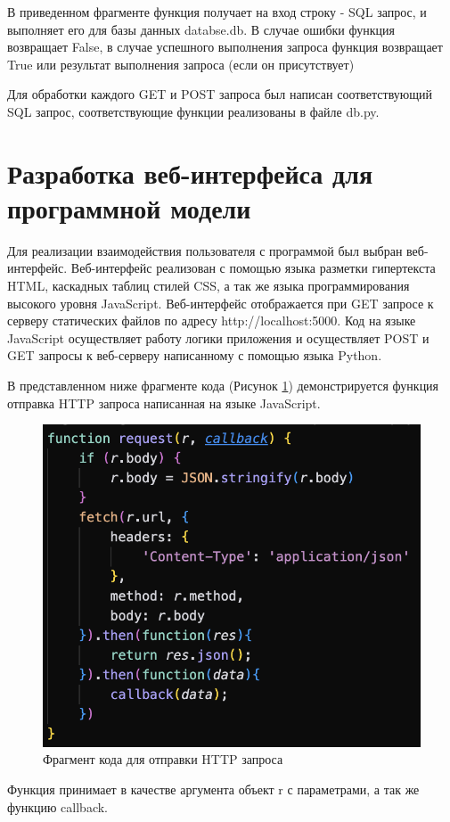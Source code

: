 \documentclass[14pt]{extreport}
\begin{document}
В приведенном фрагменте функция получает на вход строку - SQL запрос, и выполняет его для базы данных databse.db. В случае ошибки функция возвращает False, в случае успешного выполнения запроса функция возвращает True или результат выполнения запроса (если он присутствует)

Для обработки каждого GET и POST запроса был написан соответствующий SQL запрос, соответствующие функции реализованы в файле db.py.

\section{Разработка веб-интерфейса для программной модели}

Для реализации взаимодействия пользователя с программой был выбран веб-интерфейс. Веб-интерфейс реализован с помощью языка разметки гипертекста HTML, каскадных таблиц стилей CSS, а так же языка программирования высокого уровня JavaScript. Веб-интерфейс отображается при GET запросе к серверу статических файлов по адресу http://localhost:5000. Код на языке JavaScript осуществляет работу логики приложения и осуществляет POST и GET запросы к веб-серверу написанному с помощью языка Python.

В представленном ниже фрагменте кода (Рисунок \ref{fig:d6}) демонстрируется функция отправка HTTP запроса написанная на языке JavaScript. 

\begin{figure}[h]   
    \centering
    \includegraphics[width=0.4\linewidth]{js.png}
    \caption{ Фрагмент кода для отправки HTTP запроса }
    \label{fig:d6}
\end{figure}

Функция принимает в качестве аргумента объект r с параметрами, а так же функцию callback.

\newpage 
\end{document}
